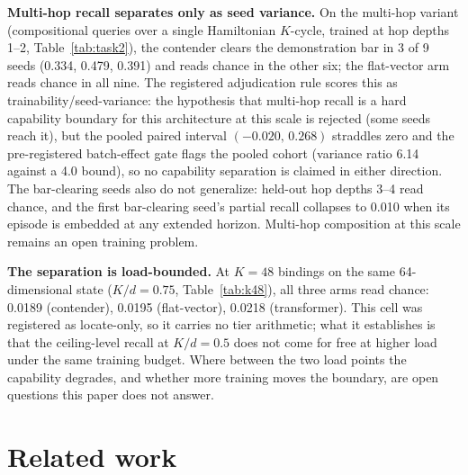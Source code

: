 \documentclass{article}
\begin{document}
\textbf{Multi-hop recall separates only as seed variance.} On the
multi-hop variant (compositional queries over a single Hamiltonian
$K$-cycle, trained at hop depths 1--2, Table~\ref{tab:task2}), the contender clears the
demonstration bar in 3 of 9 seeds (0.334, 0.479, 0.391) and reads chance
in the other six; the flat-vector arm reads chance in all
nine. %
The registered adjudication rule scores this as
trainability/seed-variance: the hypothesis that multi-hop recall is a hard
capability boundary for this architecture at this scale is rejected (some
seeds reach it), but the pooled paired interval $(-0.020,\, 0.268)$
straddles zero and the pre-registered batch-effect gate flags the pooled
cohort (variance ratio 6.14 against a 4.0 bound), so no capability
separation is claimed in either direction. %
The bar-clearing seeds also do not generalize: held-out hop depths 3--4
read chance, and the first bar-clearing seed's partial recall collapses to
0.010 when its episode is embedded at any extended
horizon. %
Multi-hop composition at this scale remains an open training problem.

\begin{table}[t]
\centering
\small
\tablekstress
\caption{Stress cell at $K{=}48$ bindings on the same $d{=}64$ state
($K/d = 0.75$; chance 0.021). Every arm, including the matrix fast-weight
model, reads chance: the recall separation of Table~\ref{tab:main} is
load-bounded and does not extend to this operating point at this scale
and budget.}
\label{tab:k48}
\end{table}

\textbf{The separation is load-bounded.} At $K = 48$ bindings on the same
64-dimensional state ($K/d = 0.75$, Table~\ref{tab:k48}), all three arms read chance: 0.0189
(contender), 0.0195 (flat-vector), 0.0218
(transformer). %
This cell was registered as locate-only, so it carries no tier
arithmetic; what it establishes is that the ceiling-level recall at
$K/d = 0.5$ does not come for free at higher load under the same training
budget. Where between the two load points the capability degrades, and
whether more training moves the boundary, are open questions this paper
does not answer.

\section{Related work}
\label{sec:related}
\end{document}
